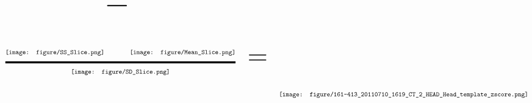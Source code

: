 \documentclass[32pt,a4paper]{article}
\author{John Muschelli}
\newcommand*{\Scale}[2][4]{\scalebox{#1}{\raisebox{1.25em}{\ensuremath{#2}}}}%
\newcommand{\thickfrac}[2]{\genfrac{}{}{3pt}{}{#1}{#2}}
\begin{document}
\pagestyle{empty}
$$
\thickfrac{\texttt{[image: figure/SS\_Slice.png]} \Scale[5]{-} \texttt{[image: figure/Mean\_Slice.png]}}{\texttt{[image: figure/SD\_Slice.png]}} \;\;\;\;\;\raisebox{-5em}{ \Scale[4]{=} \;\;\;\;\;\texttt{[image: figure/161-413\_20110710\_1619\_CT\_2\_HEAD\_Head\_template\_zscore.png]}}
$$
\end{document}
